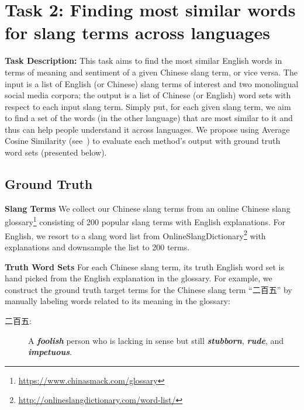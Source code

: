 \section{Task 2: Finding most similar words for slang terms across languages}
\label{sec:bleis}
\textbf{Task Description:} This task aims to find the most similar English words in terms of meaning and sentiment of a given Chinese slang term, or vice versa. The input is a list of English (or Chinese) slang terms of interest and two monolingual social media corpora; the output is a list of Chinese (or English) word sets with respect to each input slang term.
Simply put, for each given slang term, we aim to find a set of the words (in the other language) that are most similar to it and thus can help people understand it across languages.
We propose using Average Cosine Similarity (see~) to evaluate each method's output with ground truth word sets (presented below).

\subsection{Ground Truth}
\textbf{Slang Terms}
We collect our Chinese slang terms from an online Chinese slang glossary\footnote{\scriptsize{\url{https://www.chinasmack.com/glossary}}} consisting of 200 popular slang terms with English explanations. 
For English, we resort to a slang word list from OnlineSlangDictionary\footnote{\scriptsize{\url{http://onlineslangdictionary.com/word-list/}}} with explanations and downsample the list to 200 terms.

\noindent
\textbf{Truth Word Sets}
For each Chinese slang term, its truth English word set is hand picked from the English explanation in the glossary. 
For example, we construct the ground truth target terms for 
the Chinese slang term ``二百五'' by manually labeling words related to its meaning in the glossary:
~\\ \vspace{-5pt}
\begin{description}
	\item[二百五:] A \textbf{\textit{foolish}} person who is lacking in sense but still \textbf{\textit{stubborn}}, \textbf{\textit{rude}}, and \textbf{\textit{impetuous}}.
\end{description}

